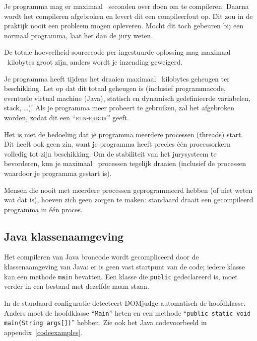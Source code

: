 \begin{description}
\item[compile-tijd]
Je programma mag er maximaal \COMPILETIME\ seconden over doen om te
compileren. Daarna wordt het compileren afgebroken en levert dit een
compileerfout op. Dit zou in de praktijk nooit een probleem mogen
opleveren. Mocht dit toch gebeuren bij een normaal programma, laat het
dan de jury weten.

\item[sourcegrootte]
De totale hoeveelheid sourcecode per ingestuurde oplossing mag
maximaal \SOURCESIZE\ kilobytes groot zijn, anders wordt je
inzending geweigerd.

\item[geheugen]
Je programma heeft tijdens het draaien maximaal \MEMLIMIT\ kilobytes
geheugen ter beschikking. Let op dat dit totaal geheugen is (inclusief
programmacode, eventuele virtual machine (Java), statisch en dynamisch
gedefinieerde variabelen, stack, \dots)! Als je programma meer
probeert te gebruiken, zal het afgebroken worden, zodat dit een
``\textsc{run-error}'' geeft.

\item[aantal processen]
Het is niet de bedoeling dat je programma meerdere processen (threads)
start. Dit heeft ook geen zin, want je programma heeft precies \'e\'en
processorkern volledig tot zijn beschikking. Om de stabiliteit van het
jurysysteem te bevorderen, kun je maximaal \PROCLIMIT\ processen
tegelijk draaien (inclusief de processen waardoor je programma
gestart is).

Mensen die nooit met meerdere processen geprogrammeerd hebben (of
niet weten wat dat is), hoeven zich geen zorgen te maken: standaard
draait een gecompileerd programma in \'e\'en proces.

\end{description}

\subsection{Java klassenaamgeving}

Het compileren van Java broncode wordt gecompliceerd door de
klassenaamgeving van Java: er is geen vast startpunt van de code;
iedere klasse kan een methode \texttt{main} bevatten. Een klasse die
\texttt{public} gedeclareerd is, moet verder in een bestand met
dezelfde naam staan.

In de standaard configuratie detecteert DOMjudge automatisch de
hoofdklasse. Anders moet de hoofdklasse ``\verb!Main!'' heten en een
methode ``\verb!public static void main(String args[])!'' hebben. Zie
ook het Java codevoorbeeld in appendix~\ref{codeexamples}.

